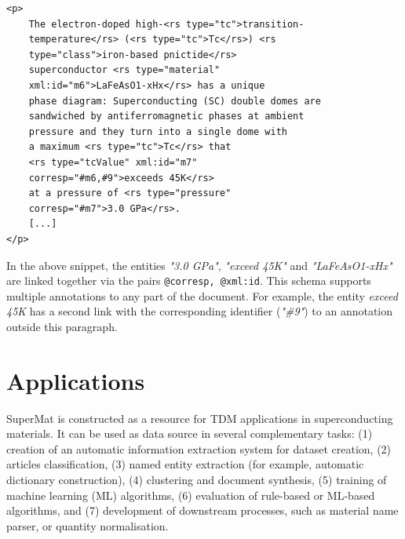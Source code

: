 \documentclass[]{interact}
\theoremstyle{plain}%
\theoremstyle{definition}
\theoremstyle{remark}
\begin{document}
\begin{verbatim}
<p>
    The electron-doped high-<rs type="tc">transition-
    temperature</rs> (<rs type="tc">Tc</rs>) <rs 
    type="class">iron-based pnictide</rs> 
    superconductor <rs type="material" 
    xml:id="m6">LaFeAsO1-xHx</rs> has a unique 
    phase diagram: Superconducting (SC) double domes are 
    sandwiched by antiferromagnetic phases at ambient 
    pressure and they turn into a single dome with 
    a maximum <rs type="tc">Tc</rs> that 
    <rs type="tcValue" xml:id="m7" 
    corresp="#m6,#9">exceeds 45K</rs> 
    at a pressure of <rs type="pressure" 
    corresp="#m7">3.0 GPa</rs>. 
    [...]
</p>
\end{verbatim}

In the above snippet, the entities \textit{"3.0 GPa"}, \textit{"exceed 45K"} and \textit{"LaFeAsO1-xHx"} are linked together via the pairs \texttt{@corresp, @xml:id}. 
This schema supports multiple annotations to any part of the document. 
For example, the entity \textit{exceed 45K} has a second link with the corresponding identifier (\textit{"\#9"}) to an annotation outside this paragraph.


\section{Applications}
\label{sec:applications}
SuperMat is constructed as a resource for TDM applications in superconducting materials. It can be used as data source in several complementary tasks: 
(1) creation of an automatic information extraction system for dataset creation,
(2) articles classification, 
(3) named entity extraction (for example, automatic dictionary construction), 
(4) clustering and document synthesis,
(5) training of machine learning (ML) algorithms,
(6) evaluation of rule-based or ML-based algorithms, and 
(7) development of downstream processes, such as material name parser, or quantity normalisation.

\end{document}
